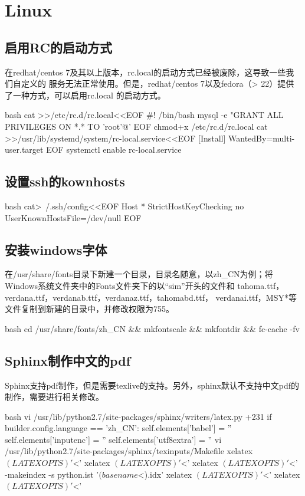 \chapter{Linux}

\section{启用RC的启动方式}
在redhat/centos 7及其以上版本，rc.local的启动方式已经被废除，这导致一些我们自定义的
服务无法正常使用。但是，redhat/centos 7以及fedora（> 22）提供了一种方式，可以启用rc.local
的启动方式。
\begin{code-block}{bash}
cat >>/etc/rc.d/rc.local<<EOF
#! /bin/bash
mysql -e  "GRANT ALL PRIVILEGES ON *.* TO 'root'@'%
EOF
chmod+x /etc/rc.d/rc.local
cat >>/usr/lib/systemd/system/rc-local.service<<EOF
[Install]
WantedBy=multi-user.target
EOF
systemctl enable rc-local.service
\end{code-block}

\section{设置ssh的kownhosts}
\begin{code-block}{bash}
cat>~/.ssh/config<<EOF
Host *
    StrictHostKeyChecking no
    UserKnownHostsFile=/dev/null
EOF
\end{code-block}

\section{安装windows字体}
在/usr/share/fonts目录下新建一个目录，目录名随意，以zh\_CN为例；将Windows系统文件夹中的Fonts文件夹下的以“sim”开头的文件和
tahoma.ttf，verdana.ttf，verdanab.ttf，verdanaz.ttf，tahomabd.ttf，
verdanai.ttf，MSY*等文件复制到新建的目录中，并修改权限为755。
\begin{code-block}{bash}
cd /usr/share/fonts/zh_CN && mkfontscale && mkfontdir && fc-cache -fv
\end{code-block}

\section{Sphinx制作中文的pdf}
Sphinx支持pdf制作，但是需要texlive的支持。另外，sphinx默认不支持中文pdf的制作，需要进行相关修改。
\begin{code-block}{bash}
vi /usr/lib/python2.7/site-packages/sphinx/writers/latex.py +231
            if builder.config.language == 'zh_CN':
                self.elements['babel'] = ''
                self.elements['inputenc'] = ''
                self.elements['utf8extra'] = ''
vi /usr/lib/python2.7/site-packages/sphinx/texinputs/Makefile
        xelatex $(LATEXOPTS) '$<'
        xelatex $(LATEXOPTS) '$<'
        xelatex $(LATEXOPTS) '$<'
        -makeindex -s python.ist '$(basename $<).idx'
        xelatex $(LATEXOPTS) '$<'
        xelatex $(LATEXOPTS) '$<'
\end{code-block}

